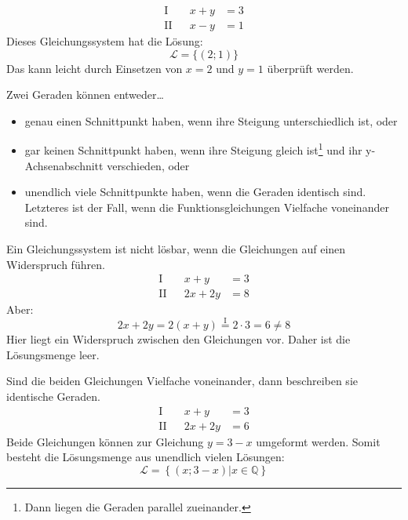 \begin{bsp}
 \begin{align*}
  \text{I} && x+y &= 3\\
  \text{II} && x-y &= 1 
 \end{align*}
 Dieses Gleichungssystem hat die Lösung:
 \begin{equation*}
  \mathcal{L} = \lbrace (2;1)\rbrace
 \end{equation*}
 Das kann leicht durch Einsetzen von \(x=2\) und \(y=1\) überprüft werden.
\end{bsp}

\begin{beme}
 Zwei Geraden können entweder\ldots
 \begin{itemize}
  \item genau einen Schnittpunkt haben, wenn ihre Steigung unterschiedlich ist, oder
  \item gar keinen Schnittpunkt haben, wenn ihre Steigung gleich ist\footnote{Dann liegen die Geraden parallel zueinander.} und ihr y-Achsenabschnitt verschieden, oder
  \item unendlich viele Schnittpunkte haben, wenn die Geraden identisch sind. Letzteres ist der Fall, wenn die Funktionsgleichungen Vielfache voneinander sind.
 \end{itemize}
\end{beme}

\begin{bsp}
 Ein Gleichungssystem ist nicht lösbar, wenn die Gleichungen auf einen Widerspruch führen.
 \begin{align*}
  \text{I} && x+y &= 3\\
  \text{II} && 2x+2y &= 8  
 \end{align*}
 Aber:
 \begin{equation*}
  2x+2y = 2(x+y) \stackrel{\text{I}}{=}2 \cdot 3 = 6 \ne 8 
 \end{equation*}
 Hier liegt ein Widerspruch zwischen den Gleichungen vor. Daher ist die Lösungsmenge leer.
\end{bsp}

\begin{bsp}
 Sind die beiden Gleichungen Vielfache voneinander, dann beschreiben sie identische Geraden.
 \begin{align*}
  \text{I} && x+y &= 3\\
  \text{II} && 2x+2y &= 6  
 \end{align*}
 Beide Gleichungen können zur Gleichung \(y=3-x\) umgeformt werden. Somit besteht die Lösungsmenge aus unendlich vielen Lösungen:
 \begin{equation*}
  \mathcal{L} = \left\lbrace (x;3-x) | x\in\mathbb{Q} \right\rbrace
 \end{equation*}

\end{bsp}

